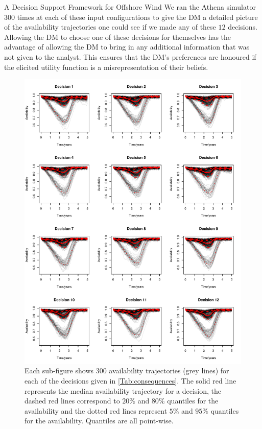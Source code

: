 \begin{chapter}{A Decision Support Framework for Offshore Wind \label{Ch:ds-for-ow}}
We ran the Athena simulator $300$ times at each of these input configurations to give the DM a detailed picture of the availability trajectories one could see if we made any of these $12$ decisions. Allowing the DM to choose one of these decisions for themselves has the advantage of allowing the DM to bring in any additional information that was not given to the analyst. This ensures that the DM's preferences are honoured if the elicited utility function is a misrepresentation of their beliefs.
\begin{figure}
 \centering
 \includegraphics[width=\textwidth]{fig-ds/final-decisions-bold.pdf}
 \caption{Each sub-figure shows $300$ availability trajectories (grey lines) for each of the decisions given in \cref{Tab:consequences}. The solid red line represents the median availability trajectory for a decision, the dashed red lines correspond to $20\%$ and $80\%$ quantiles for the availability and the dotted red lines represent $5\%$ and $95\%$ quantiles for the availability. Quantiles are all point-wise.\label{Fig:final-avail}}

\end{figure}
\end{chapter}
